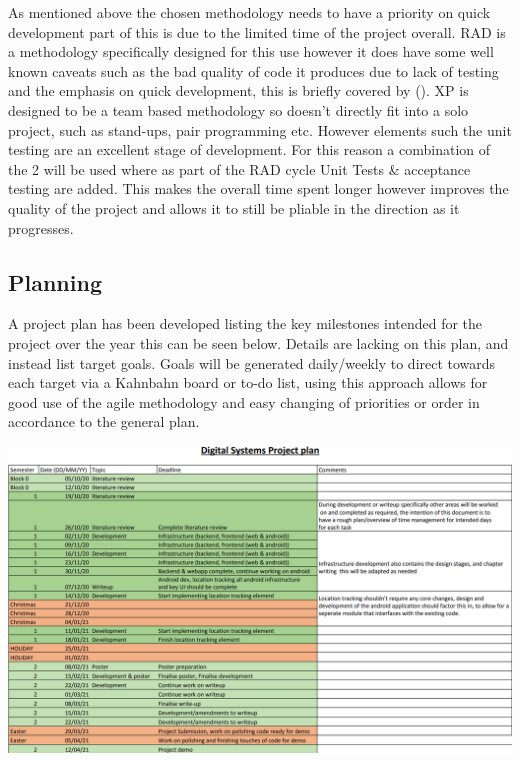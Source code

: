 As mentioned above the chosen methodology needs to have a priority on quick development part of this is due to the limited time of the project overall. RAD is a methodology specifically designed for this use however it does have some well known caveats such as the bad quality of code it produces due to lack of testing and the emphasis on quick development, this is briefly covered by (\cite{kissflow_2019_rapid}). XP is designed to be a team based methodology so doesn't directly fit into a solo project, such as stand-ups, pair programming etc. However elements such the unit testing are an excellent stage of development. For this reason a combination of the 2 will be used where as part of the RAD cycle Unit Tests \& acceptance testing are added. This makes the overall time spent longer however improves the quality of the project and allows it to still be pliable in the direction as it progresses.

\subsection{Planning}
A project plan has been developed listing the key milestones intended for the project over the year this can be seen below. Details are lacking on this plan, and instead list target goals. Goals will be generated daily/weekly to direct towards each target via a Kahnbahn board or to-do list, using this approach allows for good use of the agile methodology and easy changing of priorities or order in accordance to the general plan.

\begin{center}
	\includegraphics[width=\linewidth]{./images/planning/projectplan.png}\\
\end{center}

